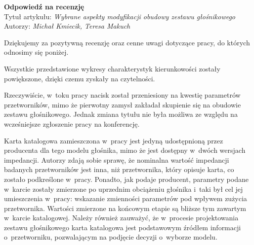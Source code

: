 \documentclass[12pt]{article}
\begin{document}
    
    \begin{center}
        \textbf{Odpowiedź na recenzję }\\
        \vspace{10pt}
        Tytuł artykułu: \textit{Wybrane aspekty modyfikacji obudowy zestawu głośnikowego} \\
        Autorzy: \textit{Michał Kmiecik, Teresa Makuch}
    \end{center}

    Dziękujemy za pozytywną recenzję oraz cenne uwagi dotyczące pracy, do których odnosimy się poniżej.
    
    Wszystkie przedstawione wykresy charakterystyk kierunkowości zostały powiększone, dzięki czemu zyskały na czytelności.
    
    Rzeczywiście, w~toku pracy nacisk został przeniesiony na kwestię parametrów przetworników, mimo że pierwotny zamysł zakładał skupienie się na obudowie zestawu głośnikowego. Jednak zmiana tytułu nie była możliwa ze względu na wcześniejsze zgłoszenie pracy na konferencję.
    
    Karta katalogowa zamieszczona w~pracy jest jedyną udostępnioną przez producenta dla tego modelu głośnika, mimo że jest dostępny w~dwóch wersjach impedancji. Autorzy zdają sobie sprawę, że nominalna wartość impedancji badanych przetworników jest inna, niż przetwornika, który opisuje karta, co zostało podkreślone w~pracy. Ponadto, jak podaje producent, parametry podane w~karcie zostały zmierzone po uprzednim obciążeniu głośnika i~taki był cel jej umieszczenia w~pracy: wskazanie zmienności parametrów pod wpływem zużycia przetwornika. Wartości zmierzone na końcowym etapie są bliższe tym zawartym w~karcie katalogowej. Należy również zauważyć, że w~procesie projektowania zestawu głośnikowego karta katalogowa jest podstawowym źródłem informacji o~przetworniku, pozwalającym na podjęcie decyzji o~wyborze modelu.
    
\end{document}
